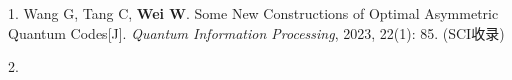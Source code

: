 \begin{publications}{99}
\ifphd
{}
\else
{}
\fi

\item[1.]
Wang G, Tang C, \textbf{Wei W}. Some New Constructions of Optimal Asymmetric Quantum Codes[J]. \textit{Quantum Information Processing}, 2023, 22(1): 85. (SCI收录)

\item[2.]



\end{publications}
